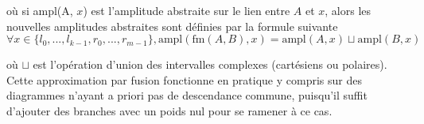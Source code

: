 
\noindent où si ampl(A, $x$) est l'amplitude abstraite sur le lien entre $A$ et $x$, alors les nouvelles amplitudes abstraites sont définies par la formule suivante
$$\forall x \in \{l_0, ..., l_{k-1}, r_0, ..., r_{m-1}\}, \text{ampl}(\text{fm}(A, B), x) = \text{ampl}(A, x) \sqcup \text{ampl}(B, x)$$

\noindent où $\sqcup$ est l'opération d'union des intervalles complexes (cartésiens ou polaires). Cette approximation par fusion fonctionne en pratique y compris sur des diagrammes n'ayant a priori pas de descendance commune, puisqu'il suffit d'ajouter des branches avec un poids nul pour se ramener à ce cas.

